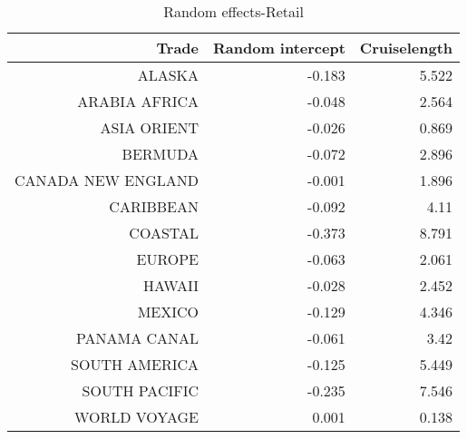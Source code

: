 \documentclass{article}
\begin{document}
\begin{table}[H]
	\centering
	\begin{tabular}{rrr}
		Trade & Random intercept &  Cruiselength \\
		\hline 
		\hline 
		ALASKA & -0.183 & 5.522 \\
		ARABIA  AFRICA & -0.048 & 2.564 \\
		ASIA ORIENT & -0.026 & 0.869 \\
		BERMUDA & -0.072 & 2.896 \\
		CANADA NEW ENGLAND & -0.001 & 1.896 \\
		CARIBBEAN & -0.092 & 4.11 \\
		COASTAL & -0.373 & 8.791 \\
		EUROPE & -0.063 & 2.061 \\
		HAWAII & -0.028 & 2.452 \\
		MEXICO & -0.129 & 4.346 \\
		PANAMA CANAL & -0.061 & 3.42 \\
		SOUTH AMERICA & -0.125 & 5.449 \\
		SOUTH PACIFIC & -0.235 & 7.546 \\
		WORLD VOYAGE & 0.001 & 0.138 \\
		\hline 
		\hline 
	\end{tabular}
	\caption{Random effects-Retail}
\end{table}
	
\end{document}
